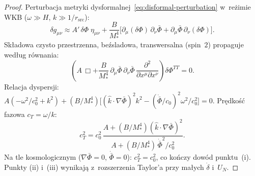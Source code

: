 \begin{proof}
Perturbacja metryki dysformalnej~\eqref{eq:disformal-perturbation}
w~re\.zimie WKB ($\omega \gg H$, $k \gg 1/r_{\mathrm{src}}$):
\[
  \delta g_{\mu\nu}
  \approx A'\,\delta\Phi\;\eta_{\mu\nu}
  + \frac{B}{M_*^4}\bigl[
    \partial_\mu(\delta\Phi)\,\partial_\nu\bar\Phi
  + \partial_\mu\bar\Phi\,\partial_\nu(\delta\Phi)\bigr].
\]
Sk\l{}adowa czysto przestrzenna, be\'zsladowa, transwersalna
(spin~$2$) propaguje wed\l{}ug r\'ownania:
\[
  \left(A\,\Box + \frac{B}{M_*^4}\,
  \partial_\mu\bar\Phi\,\partial_\nu\bar\Phi\,
  \frac{\partial^2}{\partial x^\mu\partial x^\nu}
  \right)\!\delta\Phi^{TT} = 0.
\]
Relacja dyspersji: $A(-\omega^2/c_0^2 + k^2)
+ (B/M_*^4)\bigl[(\hat k \cdot \nabla\bar\Phi)^2 k^2
- (\dot{\bar\Phi}/c_0)^2\omega^2/c_0^2\bigr] = 0$.
Pr\k{e}dko\'s\'c fazowa $c_T = \omega/k$:
\[
  c_T^2 = c_0^2\,\frac{A + (B/M_*^4)(\hat k \cdot \nabla\bar\Phi)^2}
  {A + (B/M_*^4)\,\dot{\bar\Phi}^2/c_0^2}.
\]
Na tle kosmologicznym ($\nabla\bar\Phi = 0$, $\dot{\bar\Phi} = 0$):
$c_T^2 = c_0^2$, co ko\'nczy dow\'od punktu~(i).
Punkty (ii) i~(iii) wynikaj\k{a} z~rozszerzenia
Taylor'a przy ma\l{}ych $\dot\delta$ i~$U_N$.
\end{proof}

